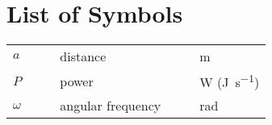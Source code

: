 %
%

\chapter*{List of Symbols}



\begin{table}[ht]%
	\begin{tabular}{l l l l l}
		$a$ & $\quad$ & distance & $\quad$ & \si{\meter} \\
        $P$ & $\quad$ & power & $\quad$ & \si{\watt} (\si{\joule\per\second}) \\
        $\omega$ & $\quad$ & angular frequency & $\quad$ & \si{\radian} \\
	\end{tabular}
\end{table}

\cleardoublepage %